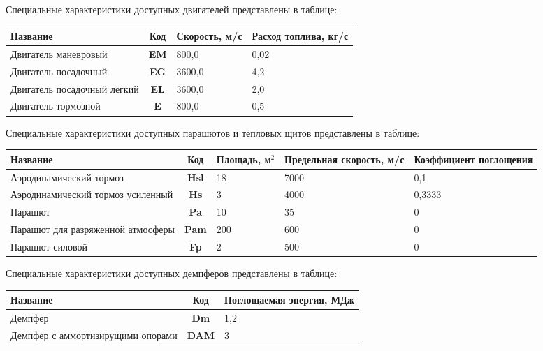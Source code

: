 \documentclass[12pt,a4paper]{article}
\begin{document}
Специальные характеристики доступных двигателей представлены в таблице:

\begin{center}
\begin{tabular}{ |p{6.5cm}|c|p{3.5cm}|p{3.5cm}| }
  \hline
  \textbf{Название} & \textbf{Код} &
  \textbf{Скорость, м/с} & \textbf{Расход топлива, кг/с}\\
  \hline
  Двигатель маневровый & \textbf{EM} & 800,0 & 0,02 \\
  \hline
  Двигатель посадочный & \textbf{EG} & 3600,0 & 4,2 \\
  \hline
  Двигатель посадочный легкий & \textbf{EL} & 3600,0 & 2,0 \\
  \hline
  Двигатель тормозной & \textbf{E} & 800,0 & 0,5 \\
  \hline
\end{tabular}
\end{center}

Специальные характеристики доступных парашютов и тепловых щитов представлены в таблице:

\begin{center}
\begin{tabular}{ |p{4cm}|c|p{3cm}|p{3cm}|p{3cm}| }
  \hline
  \textbf{Название} & \textbf{Код} &
  \textbf{Площадь, $\text{м}^2$} & \textbf{Пре\-дель\-ная скорость, м/с} &
  \textbf{Коэффициент поглощения} \\
  \hline
Аэродинамический тормоз & \textbf{Hsl} & 18 & 7000 & 0,1 \\
\hline
Аэродинамический тормоз усиленный & \textbf{Hs} & 3 & 4000 & 0,3333 \\
\hline
Парашют & \textbf{Pa} & 10 & 35 & 0 \\
\hline
Парашют для разряженной атмосферы & \textbf{Pam} & 200 & 600 & 0 \\
\hline
Парашют силовой & \textbf{Fp} & 2 & 500 & 0 \\
\hline
\end{tabular}
\end{center}

Специальные характеристики доступных демпферов представлены в таблице:

\begin{center}
\begin{tabular}{ |p{8cm}|c|p{5cm}| }
  \hline
  \textbf{Название} & \textbf{Код} &
  \textbf{Поглощаемая энергия, МДж} \\
  \hline
  Демпфер & \textbf{Dm} & 1,2 \\
  \hline
  Демпфер с аммортизирущими опорами & \textbf{DAM} & 3 \\
  \hline
\end{tabular}
\end{center}
\end{document}
